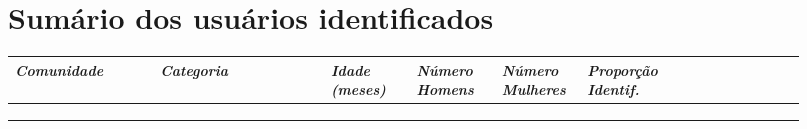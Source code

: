 
\chapter{Sumário dos usuários identificados}
\label{app:info}
\small
\begin{longtabu}{@{}
	p{0.17\linewidth}
	p{0.2\linewidth}
	P{0.1\linewidth}
	P{0.1\linewidth}
	P{0.1\linewidth}
	P{0.1\linewidth}
	p{0.15\linewidth}@{}}
\toprule
\textit{Comunidade}  & \textit{Categoria}    & \textit{Idade (meses)} & \textit{Número Homens} & \textit{Número Mulheres} & \textit{Proporção Identif.} \\ \midrule
\endhead

\\ \hline
\endfoot

\\
\endlastfoot


\end{longtabu}

